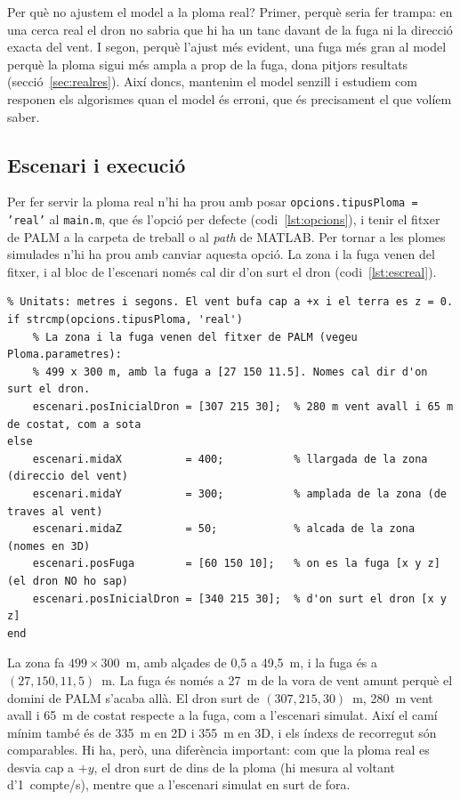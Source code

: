 \documentclass[11pt,a4paper]{article}
\begin{document}
Per què no ajustem el model a la ploma real? Primer, perquè seria fer trampa: en una cerca real el dron no sabria que hi ha un tanc davant de la fuga ni la direcció exacta del vent. I segon, perquè l'ajust més evident, una fuga més gran al model perquè la ploma sigui més ampla a prop de la fuga, dona pitjors resultats (secció~\ref{sec:realres}). Així doncs, mantenim el model senzill i estudiem com responen els algorismes quan el model és erroni, que és precisament el que volíem saber.

\subsection{Escenari i execució}
\label{sec:realesc}

Per fer servir la ploma real n'hi ha prou amb posar \texttt{opcions.tipusPloma = 'real'} al \texttt{main.m}, que és l'opció per defecte (codi~\ref{lst:opcions}), i tenir el fitxer de PALM a la carpeta de treball o al \emph{path} de MATLAB. Per tornar a les plomes simulades n'hi ha prou amb canviar aquesta opció. La zona i la fuga venen del fitxer, i al bloc de l'escenari només cal dir d'on surt el dron (codi~\ref{lst:escreal}).

\begin{lstlisting}[caption={Escenari del \texttt{main.m}: la ploma real té el seu.}, label=lst:escreal]
%% ============================= ESCENARI ==============================
% Unitats: metres i segons. El vent bufa cap a +x i el terra es z = 0.
if strcmp(opcions.tipusPloma, 'real')
    % La zona i la fuga venen del fitxer de PALM (vegeu Ploma.parametres):
    % 499 x 300 m, amb la fuga a [27 150 11.5]. Nomes cal dir d'on surt el dron.
    escenari.posInicialDron = [307 215 30];  % 280 m vent avall i 65 m de costat, com a sota
else
    escenari.midaX          = 400;           % llargada de la zona (direccio del vent)
    escenari.midaY          = 300;           % amplada de la zona (de traves al vent)
    escenari.midaZ          = 50;            % alcada de la zona (nomes en 3D)
    escenari.posFuga        = [60 150 10];   % on es la fuga [x y z] (el dron NO ho sap)
    escenari.posInicialDron = [340 215 30];  % d'on surt el dron [x y z]
end
\end{lstlisting}

La zona fa $499 \times 300$~m, amb alçades de 0,5 a 49,5~m, i la fuga és a $(27, 150, 11{,}5)$~m. La fuga és només a 27~m de la vora de vent amunt perquè el domini de PALM s'acaba allà. El dron surt de $(307, 215, 30)$~m, 280~m vent avall i 65~m de costat respecte a la fuga, com a l'escenari simulat. Així el camí mínim també és de 335~m en 2D i 355~m en 3D, i els índexs de recorregut són comparables. Hi ha, però, una diferència important: com que la ploma real es desvia cap a $+y$, el dron surt de dins de la ploma (hi mesura al voltant d'1~compte/s), mentre que a l'escenari simulat en surt de fora.
\end{document}
